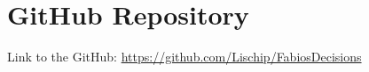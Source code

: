 \section{GitHub Repository}
\label{s:repository}

Link to the GitHub: \href{https://github.com/Lischip/FabiosDecisions}{https://github.com/Lischip/FabiosDecisions}